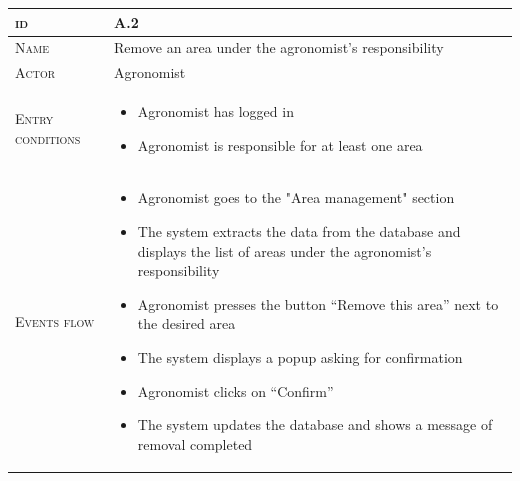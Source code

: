 \begin{table}[H]
    \centering
    \begin{tabular}[c]{|l|p{}|}
        \hline %
    	\textsc{id}                 &   A.2\\
    	\hline %
    	\textsc{Name}               &   Remove an area under the agronomist's responsibility\\
    	\hline %
    	\textsc{Actor}             &   Agronomist\\
    	\hline %
    	\textsc{Entry conditions}   &  
    	\begin{itemize}
                                    	    \item Agronomist has logged in
                                    	    \item Agronomist is responsible for at least one area
                                        \end{itemize}\\
    	\hline %
    	\textsc{Events flow}         &   %
            	                        \begin{itemize}
                                    	    \item Agronomist goes to the "Area management" section
                                    	    \item The system extracts the data from the database and displays the list of areas under the agronomist's responsibility
                                    	    \item Agronomist presses the button “Remove this area” next to the desired area
                                    		\item The system displays a popup asking for confirmation
                                    		\item Agronomist clicks on “Confirm”
                                    		\item The system updates the database and shows a message of removal completed
                                        \end{itemize}\\

\end{tabular}
\end{table}
